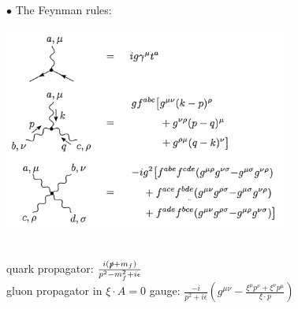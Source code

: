 \documentclass[9pt,a4paper,unknownkeysallowed,xcolor=dvipsnames,aspectratio=43]{beamer}
\begin{document}
%
%
%
\begin{frame}

{\color{darkred}\Large$\bullet$} {The Feynman rules:}\\
\begin{center}
    \includegraphics[width=0.7\textwidth]{02/FR.png}
\end{center}\\
quark propagator: $\frac{i(\slashed{p}+m_f)}{p^2 - m_f^2 + i\epsilon}$\\
gluon propagator in $\xi\cdot A = 0$ gauge: $\frac{-i}{p^2 + i\epsilon}\left(g^{\mu\nu}-\frac{\xi^\mu p^\nu + \xi^\nu p^\mu}{\xi\cdot p}\right)$
\end{frame}
%
%
\end{document}
